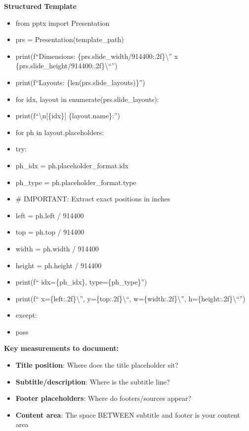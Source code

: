 \documentclass[11pt]{article}
\begin{document}
\textbf{Structured Template}
\begin{itemize}[leftmargin=*,itemsep=2pt,topsep=2pt]
\item {} from pptx import Presentation
\item {} prs = Presentation(template\_\allowbreak{}path)
\item {} print(f``Dimensions: \{prs.slide\_\allowbreak{}width/914400:.2f\}\textbackslash{}'' x \{prs.slide\_\allowbreak{}height/914400:.2f\}\textbackslash{}``'')
\item {} print(f``Layouts: \{len(prs.slide\_\allowbreak{}layouts)\}'')
\item {} for idx, layout in enumerate(prs.slide\_\allowbreak{}layouts):
\item {} print(f``\textbackslash{}n[\{idx\}] \{layout.name\}:'')
\item {} for ph in layout.placeholders:
\item {} try:
\item {} ph\_\allowbreak{}idx = ph.placeholder\_\allowbreak{}format.idx
\item {} ph\_\allowbreak{}type = ph.placeholder\_\allowbreak{}format.type
\item {} \# IMPORTANT: Extract exact positions in inches
\item {} left = ph.left / 914400
\item {} top = ph.top / 914400
\item {} width = ph.width / 914400
\item {} height = ph.height / 914400
\item {} print(f`` idx=\{ph\_\allowbreak{}idx\}, type=\{ph\_\allowbreak{}type\}'')
\item {} print(f`` x=\{left:.2f\}\textbackslash{}'', y=\{top:.2f\}\textbackslash{}``, w=\{width:.2f\}\textbackslash{}'', h=\{height:.2f\}\textbackslash{}``'')
\item {} except:
\item {} pass
\end{itemize}

\textbf{Key measurements to document:}

\begin{itemize}[leftmargin=*,itemsep=2pt,topsep=2pt]
\item {} \textbf{Title position}: Where does the title placeholder sit?
\item {} \textbf{Subtitle/description}: Where is the subtitle line?
\item {} \textbf{Footer placeholders}: Where do footers/sources appear?
\item {} \textbf{Content area}: The space BETWEEN subtitle and footer is your content area
\end{itemize}
\end{document}
